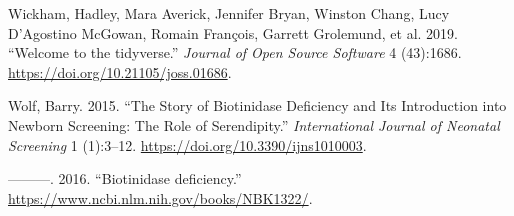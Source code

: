 \documentclass[review]{elsarticle}
\begin{document}
\begin{hangparas}{1.5em}{1}
\hypertarget{citeproc_bib_item_14}{Wickham, Hadley, Mara Averick, Jennifer Bryan, Winston Chang, Lucy D’Agostino McGowan, Romain François, Garrett Grolemund, et al. 2019. “Welcome to the tidyverse.” \textit{Journal of Open Source Software} 4 (43):1686. \href{https://doi.org/10.21105/joss.01686}{https://doi.org/10.21105/joss.01686}.}

\hypertarget{citeproc_bib_item_15}{Wolf, Barry. 2015. “The Story of Biotinidase Deficiency and Its Introduction into Newborn Screening: The Role of Serendipity.” \textit{International Journal of Neonatal Screening} 1 (1):3–12. \href{https://doi.org/10.3390/ijns1010003}{https://doi.org/10.3390/ijns1010003}.}

\hypertarget{citeproc_bib_item_16}{———. 2016. “Biotinidase deficiency.” \href{https://www.ncbi.nlm.nih.gov/books/NBK1322/}{https://www.ncbi.nlm.nih.gov/books/NBK1322/}.}
\end{hangparas}
\end{document}
